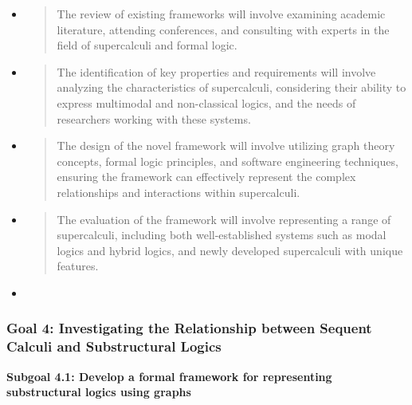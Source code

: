 \begin{itemize}
  \begin{itemize}
  \item
    \begin{quote}
    The review of existing frameworks will involve examining academic
    literature, attending conferences, and consulting with experts in
    the field of supercalculi and formal logic.
    \end{quote}
  \item
    \begin{quote}
    The identification of key properties and requirements will involve
    analyzing the characteristics of supercalculi, considering their
    ability to express multimodal and non-classical logics, and the
    needs of researchers working with these systems.
    \end{quote}
  \item
    \begin{quote}
    The design of the novel framework will involve utilizing graph
    theory concepts, formal logic principles, and software engineering
    techniques, ensuring the framework can effectively represent the
    complex relationships and interactions within supercalculi.
    \end{quote}
  \item
    \begin{quote}
    The evaluation of the framework will involve representing a range of
    supercalculi, including both well-established systems such as modal
    logics and hybrid logics, and newly developed supercalculi with
    unique features.
    \end{quote}
  \end{itemize}
\end{itemize}

\begin{itemize}
\tightlist
\item
\end{itemize}

\hypertarget{goal-4-investigating-the-relationship-between-sequent-calculi-and-substructural-logics}{%
\subsubsection{Goal 4: Investigating the Relationship between Sequent
Calculi and Substructural
Logics}\label{goal-4-investigating-the-relationship-between-sequent-calculi-and-substructural-logics}}

\textbf{Subgoal 4.1: Develop a formal framework for representing
substructural logics using graphs}

